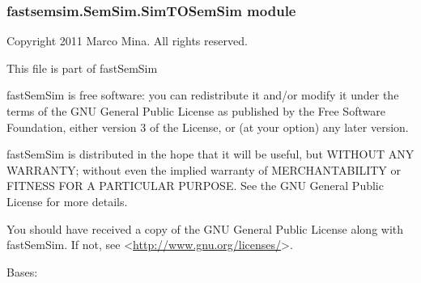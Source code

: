 \documentclass[letterpaper,10pt,english]{sphinxmanual}
\begin{document}
\subsubsection{fastsemsim.SemSim.SimTOSemSim module}
\label{fastsemsim.SemSim:module-fastsemsim.SemSim.SimTOSemSim}\label{fastsemsim.SemSim:fastsemsim-semsim-simtosemsim-module}
Copyright 2011 Marco Mina. All rights reserved.

This file is part of fastSemSim

fastSemSim is free software: you can redistribute it and/or modify
it under the terms of the GNU General Public License as published by
the Free Software Foundation, either version 3 of the License, or
(at your option) any later version.

fastSemSim is distributed in the hope that it will be useful,
but WITHOUT ANY WARRANTY; without even the implied warranty of
MERCHANTABILITY or FITNESS FOR A PARTICULAR PURPOSE.  See the
GNU General Public License for more details.

You should have received a copy of the GNU General Public License
along with fastSemSim.  If not, see \textless{}\href{http://www.gnu.org/licenses/}{http://www.gnu.org/licenses/}\textgreater{}.

\begin{fulllineitems}
\label{fastsemsim.SemSim:fastsemsim.SemSim.SimTOSemSim.SimTOSemSim}
Bases: {\hyperref[fastsemsim.SemSim:fastsemsim.SemSim.TermSemSim.TermSemSim]{}}

\begin{fulllineitems}
\label{fastsemsim.SemSim:fastsemsim.SemSim.SimTOSemSim.SimTOSemSim.IC_based}
\end{fulllineitems}


\begin{fulllineitems}
\label{fastsemsim.SemSim:fastsemsim.SemSim.SimTOSemSim.SimTOSemSim.SS_type}
\end{fulllineitems}


\end{fulllineitems}
\end{document}
